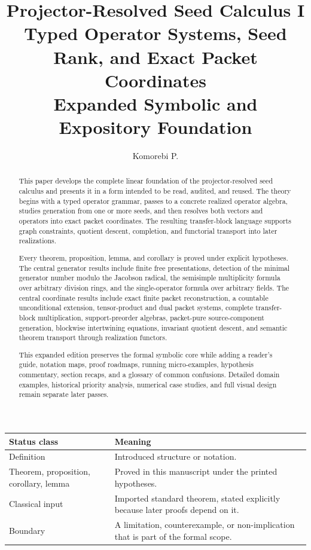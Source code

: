 \documentclass[11pt]{article}
\title{\textbf{Projector-Resolved Seed Calculus I}\\[0.4em]
\large Typed Operator Systems, Seed Rank, and Exact Packet Coordinates\\[0.6em]
\normalsize Expanded Symbolic and Expository Foundation}
\author{Komorebi P.}
\date{}
\theoremstyle{definition}
\theoremstyle{remark}
\begin{document}
\maketitle

\begin{abstract}
This paper develops the complete linear foundation of the projector-resolved seed calculus and presents it in a form intended to be read, audited, and reused.  The theory begins with a typed operator grammar, passes to a concrete realized operator algebra, studies generation from one or more seeds, and then resolves both vectors and operators into exact packet coordinates.  The resulting transfer-block language supports graph constraints, quotient descent, completion, and functorial transport into later realizations.

Every theorem, proposition, lemma, and corollary is proved under explicit hypotheses.  The central generator results include finite free presentations, detection of the minimal generator number modulo the Jacobson radical, the semisimple multiplicity formula over arbitrary division rings, and the single-operator formula over arbitrary fields.  The central coordinate results include exact finite packet reconstruction, a countable unconditional extension, tensor-product and dual packet systems, complete transfer-block multiplication, support-preorder algebras, packet-pure source-component generation, blockwise intertwining equations, invariant quotient descent, and semantic theorem transport through realization functors.

This expanded edition preserves the formal symbolic core while adding a reader's guide, notation maps, proof roadmaps, running micro-examples, hypothesis commentary, section recaps, and a glossary of common confusions.  Detailed domain examples, historical priority analysis, numerical case studies, and full visual design remain separate later passes.
\end{abstract}

\begin{center}
\begin{tabularx}{0.96\textwidth}{@{}lY@{}}
\toprule
\textbf{Status class} & \textbf{Meaning}\\
\midrule
Definition & Introduced structure or notation.\\
Theorem, proposition, corollary, lemma & Proved in this manuscript under the printed hypotheses.\\
Classical input & Imported standard theorem, stated explicitly because later proofs depend on it.\\
Boundary & A limitation, counterexample, or non-implication that is part of the formal scope.\\
\bottomrule
\end{tabularx}
\end{center}
\end{document}
